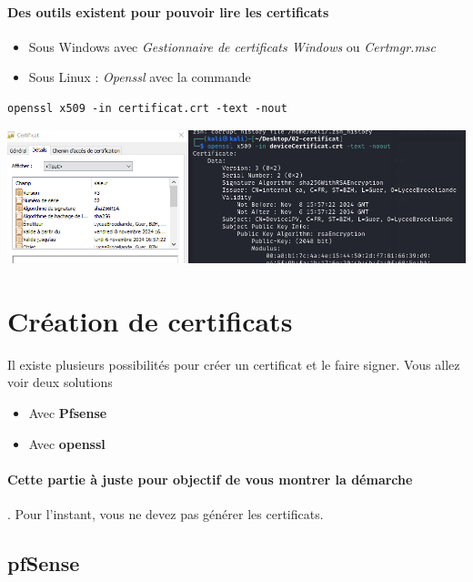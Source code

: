 \documentclass[french, 12pt]{article}%
\newcommand{\itemE}{\item[$\bullet$]}
\begin{document}
\paragraph{Des outils existent pour pouvoir lire les certificats} 
\begin{itemize}
\itemE Sous Windows avec \textit{Gestionnaire de certificats Windows} ou \textit{Certmgr.msc} 
\itemE Sous Linux : \textit{Openssl} avec la commande
\end{itemize} 

\begin{lstlisting}[style=commande]
openssl x509 -in certificat.crt -text -nout
\end{lstlisting}

\begin{center}
\includegraphics[scale=0.5]{./ressource/exCertificat}
\end{center}

\section{Création de certificats}

Il existe plusieurs possibilités pour créer un certificat et le faire signer. Vous allez voir deux solutions
\begin{itemize}
\itemE Avec \textbf{Pfsense}
\itemE Avec \textbf{openssl}
\end{itemize} 

\paragraph{Cette partie à juste pour objectif de vous montrer la démarche}. Pour l'instant, vous ne devez pas générer les certificats.

\subsection{pfSense}
\end{document}
